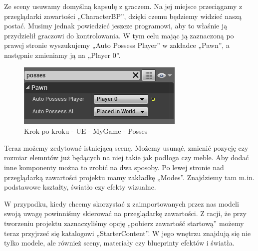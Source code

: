 \documentclass[12pt]{xmgr}
\begin{document}
Ze sceny usuwamy domyślną kapsułę z graczem. Na jej miejsce przeciągamy z przeglądarki zawartości „CharacterBP”, dzięki czemu będziemy widzieć naszą postać. Musimy jednak powiedzieć jeszcze programowi, aby to właśnie ją przydzielił graczowi do kontrolowania. W tym celu mając ją zaznaczoną po prawej stronie wyszukujemy „Auto Possess Player” w zakładce „Pawn”, a następnie zmieniamy ją na „Player 0”.

\begin{figure}[!htb]
    \begin{center}
    \includegraphics[scale=0.35]{Screeny/UeKrokPoKroku/UE-MyGame-Posses.png}
    \end{center}
    \caption{Krok po kroku - UE -  MyGame - Posses}
\end{figure}

Teraz możemy zedytować istniejącą scenę. Możemy usunąć, zmienić pozycję czy rozmiar elemntów już będących na niej takie jak podłoga czy meble. Aby dodać inne komponenty można to zrobić na dwa sposoby. Po lewej stronie nad przeglądarką zawartości projektu mamy zakładkę „Modes”. Znajdziemy tam m.in. podstawowe kształty, światło czy efekty wizualne. 

W przypadku, kiedy chcemy skorzystać z zaimportowanych przez nas modeli swoją uwagę powinniśmy skierować na przeglądarkę zawartości. Z racji, że przy tworzeniu projektu zaznaczyliśmy opcję „pobierz zawartość startową” możemy teraz przyjrzeć się katalogowi „StarterContent”. W jego wnętrzu znajdują się nie tylko modele, ale również sceny, materiały czy blueprinty efektów i światła.
\end{document}
